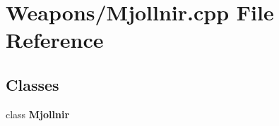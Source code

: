 \section{Weapons/\-Mjollnir.cpp File Reference}
\label{_mjollnir_8cpp}
\subsection*{Classes}
\begin{DoxyCompactItemize}
\item 
class {\bf Mjollnir}
\end{DoxyCompactItemize}
